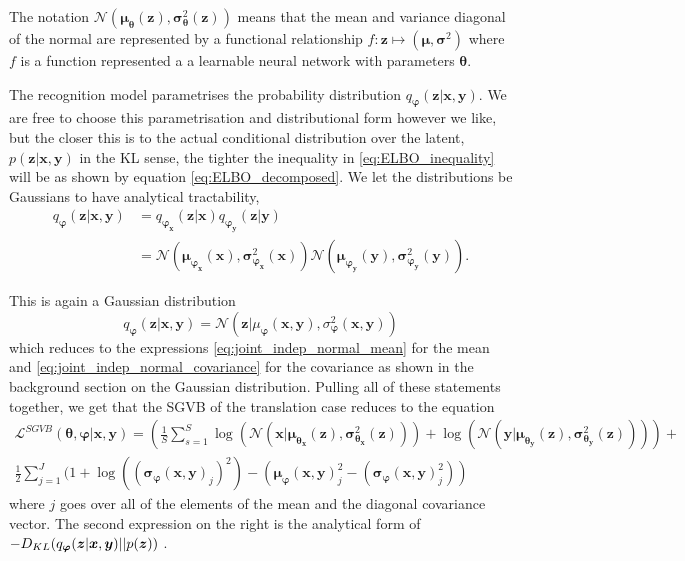 The notation $\mathcal{N}(\bm{\mu}_{\bm{\theta}}(\bm{z}), \bm{\sigma}^2_{\bm{\theta}}(\bm{z}))$
means that the mean and variance diagonal of the normal are represented by a
functional relationship $f: \bm{z} \mapsto (\bm{\mu}, \bm{\sigma}^2)$ where $f$ is a function
represented a a learnable neural network with parameters $\bm{\theta}$.

The recognition model parametrises the probability distribution
$q_{\bm{\varphi}}(\bm{z} | \bm{x}, \bm{y})$. We are free to choose this
parametrisation and distributional form however we like, but the closer this is to the actual conditional distribution over the
latent, $p(\bm{z} | \bm{x}, \bm{y})$ in the KL sense, the tighter the
inequality in \eqref{eq:ELBO_inequality} will be as shown by equation
\eqref{eq:ELBO_decomposed}. We let the distributions be Gaussians to have
analytical tractability, 
\begin{align*}
  q_{\bm{\varphi}}(\bm{z} | \bm{x}, \bm{y}) & = q_{\bm{\varphi}_{\bm{x}}}(\bm{z} | \bm{x})q_{\bm{\varphi}_{\bm{y}}}(\bm{z} | \bm{y}) \\
                                            & = \mathcal{N}(\bm{\mu}_{\bm{\varphi}_{\bm{x}}}(\bm{x}), \bm{\sigma}^2_{\bm{\varphi}_{\bm{x}}}(\bm{x}))\mathcal{N}(\bm{\mu}_{\bm{\varphi}_{\bm{y}}}(\bm{y}), \bm{\sigma}^2_{\bm{\varphi}_{\bm{y}}}(\bm{y})).
\end{align*}

This is again a Gaussian distribution
\begin{equation}
  \label{eq:joint_variational_gaussian}
  q_{\bm{\varphi}}(\bm{z} | \bm{x}, \bm{y}) = \mathcal{N}(\bm{z} | \mu_{\bm{\varphi}}(\bm{x}, \bm{y}), \sigma^2_{\bm{\varphi}}(\bm{x}, \bm{y}))
\end{equation} which reduces to the expressions
\eqref{eq:joint_indep_normal_mean} for the mean and
\eqref{eq:joint_indep_normal_covariance} for the covariance as shown in the
background section on the Gaussian distribution.
Pulling all of these statements together, we get that the SGVB of the
translation case reduces to the equation
\begin{equation}
  \begin{split}
  \label{eq:translation_SGVB}
  \mathcal{L}^{SGVB}(\bm{\theta}, \bm{\varphi}| \bm{x}, \bm{y}) = (\frac{1}{S} \sum_{s=1}^S \log(\mathcal{N}(\bm{x} | \bm{\mu}_{\bm{\theta}_{\bm{x}}}(\bm{z}), \bm{\sigma}^2_{\bm{\theta}_{\bm{x}}}(\bm{z}))) + \log(\mathcal{N}(\bm{y} | \bm{\mu}_{\bm{\theta}_{\bm{y}}}(\bm{z}), \bm{\sigma}^2_{\bm{\theta}_{\bm{y}}}(\bm{z})))) + \\ \frac{1}{2} \sum_{j=1}^J(1 + \log((\bm{\sigma}_{\bm{\varphi}}(\bm{x}, \bm{y})_j)^2) - (\bm{\mu}_{\bm{\varphi}}(\bm{x}, \bm{y})_j^2 - (\bm{\sigma}_{\bm{\varphi}}(\bm{x}, \bm{y})_j^2))
  \end{split}
\end{equation}
where $j$ goes over all of the elements of
the mean and the diagonal covariance vector. The
second expression on the right is the analytical form of $-D_{KL}(q_{\bm{\varphi}}(\bm{z} | \bm{x}, \bm{y}) || p(\bm{z}))$ \cite{kingma_auto-encoding_2013}.
